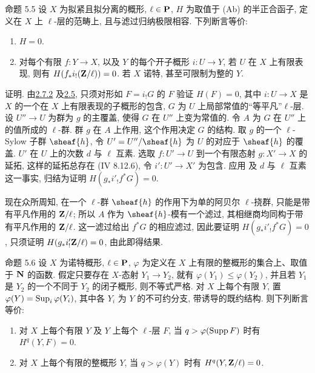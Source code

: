 \begin{enonce*}{命题 5.5}
设 $X$ 为拟紧且拟分离的概形, $\ell \in
\mathbf{P}$,
$H$ 为取值于 {\rm (Ab)} 的半正合函子,
定义在 $X$ 上 $\ell$-层的范畴上, 且与滤过归纳极限相容.
下列断言等价:
\begin{enumerate}
\renewcommand{\theenumi}{\roman{enumi}}
\renewcommand{\labelenumi}{(\theenumi)}
\item $H=0$.

\item 对每个有限 $f:Y\rightarrow X$,
以及 $Y$ 的每个开子概形 $i:U\rightarrow Y$,
若 $U$ 在 $X$ 上有限表现, 则有 $H(f_{\ast}i_{!}(\mathbf{Z}/\ell))=0$.
若 $X$ 诺特, 甚至可限制为整的 $Y$.
\end{enumerate}
\end{enonce*}

证明. 由\hyperref[IX.cor2.7.2]{2.7.2} 及\hyperref[IX.prop2.5]{2.5},
只须对形如 $F=i_{!}G$ 的 $F$ 验证 $H(F)=0$,
其中 $i:U\rightarrow X$ 是 $X$ 的一个在 $X$ 上有限表现的子概形的包含,
$G$ 为 $U$ 上局部常值的“等平凡”$\ell$-层.
设 $U''\rightarrow U$ 为群为 $g$ 的主覆盖,
使得 $G$ 在 $U''$ 上变为常值的.
令 $A$ 为 $G$ 在 $U''$ 上的值所成的 $\ell$-群.
群 $g$ 在 $A$ 上作用, 这个作用决定 $G$ 的结构.
取 $g$ 的一个 $\ell$-Sylow 子群 $\sheaf{h}$,
令 $U'=U''/\sheaf{h}$ 为 $U$ 的对应于 $\sheaf{h}$ 的覆盖.
$U'$ 在 $U$ 上的次数 $d$ 与 $\ell$ 互素.
选取 $f:U'\rightarrow U$ 到一个有限态射 $g:X'\rightarrow X$ 的延拓,
这样的延拓总存在 (\EGA IV 8.12.6),
令 $i':U'\rightarrow X'$ 为包含.
应用 及 $d$ 与 $\ell$ 互素这一事实,
归结为证明 $H(g_{\ast}i'_{!}f^{\ast} G)=0$.

现在\pageoriginale 众所周知,
在一个 $\ell$-群 $\sheaf{h}$ 的作用下为单的阿贝尔 $\ell$-挠群,
只能是带有平凡作用的 $\mathbf{Z}/\ell$;
所以 $A$ 作为 $\sheaf{h}$-模有一个滤过,
其相继商均同构于带有平凡作用的 $\mathbf{Z}/\ell$.
这一滤过给出 $f^{\ast} G$ 的相应滤过,
因此要证明 $H(g_{\ast}i'_{!} f^{\ast} G)=0$,
只须证明 $H(g_{\ast}i'_{!}\mathbf{Z}/\ell)=0$, 由此即得结果.

\begin{enonce*}{命题 5.6}
设 $X$ 为诺特概形, $\ell \in \mathbf{P}$,
$\varphi$ 为定义在 $X$ 上有限的整概形的集合上、取值于 $\mathbf{N}$ 的函数.
假定只要存在 $X$-态射 $Y_1\rightarrow Y_2$,
就有 $\varphi(Y_1)\leq \varphi(Y_2)$,
并且若 $Y_1$ 是 $Y_2$ 的一个不同于 $Y_2$ 的闭子概形, 则不等式严格.
对 $X$ 上每个有限 $Y$, 置 $\varphi(Y)=\operatorname{Sup}_i\varphi(Y_i)$,
其中各 $Y_i$ 为 $Y$ 的不可约分支, 带诱导的既约结构.
则下列断言等价:
\begin{enumerate}
\renewcommand{\theenumi}{\roman{enumi}}
\renewcommand{\labelenumi}{(\theenumi)}
\item 对 $X$ 上每个有限 $Y$ 及 $Y$ 上每个 $\ell$-层 $F$,
当 $q>\varphi(\operatorname{Supp} F)$ 时有 $H^q(Y,F)=0$.

\item 对 $X$ 上每个有限的整概形 $Y$,
当 $q>\varphi(Y)$ 时有 $H^q(Y,\mathbf{Z}/\ell)=0$.
\end{enumerate}
\end{enonce*}

